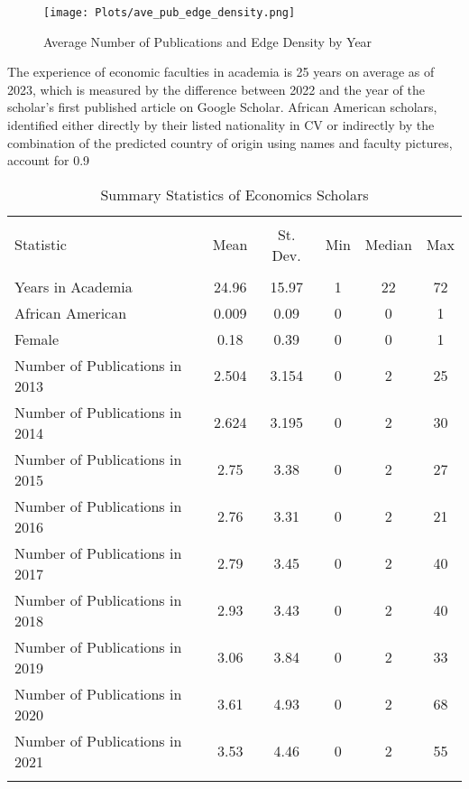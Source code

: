 \begin{figure}[!htbp]
  \caption{Average Number of Publications and Edge Density by Year}
  \centering
  \texttt{[image: Plots/ave\_pub\_edge\_density.png]}
\end{figure}

The experience of economic faculties in academia is 25 years on average as of 2023, which is measured by the difference between 2022 and the year of the scholar's first published article on Google Scholar. African American scholars, identified either directly by their listed nationality in CV or indirectly by the combination of the predicted country of origin using names and faculty pictures, account for 0.9\
\begin{table}[!htbp] \centering 
  \caption{Summary Statistics of Economics Scholars} 
\begin{tabular}{@{\extracolsep{5pt}}lccccc} 
\\[-1.8ex]\hline 
\hline \\[-1.8ex] 
Statistic & \multicolumn{1}{c}{Mean} & \multicolumn{1}{c}{St. Dev.} & \multicolumn{1}{c}{Min} & \multicolumn{1}{c}{Median} & \multicolumn{1}{c}{Max} \\ 
\hline \\[-1.8ex] 
Years in Academia & 24.96 & 15.97 & 1 & 22 & 72 \\ 
African American & 0.009 & 0.09 & 0 & 0 & 1 \\
Female & 0.18 & 0.39 & 0 & 0 & 1 \\
Number of Publications in 2013 & 2.504 & 3.154 & 0 & 2 & 25 \\ 
Number of Publications in 2014 & 2.624 & 3.195 & 0 & 2 & 30 \\ 
Number of Publications in 2015 & 2.75 & 3.38 & 0 & 2 & 27 \\ 
Number of Publications in 2016 & 2.76 & 3.31 & 0 & 2 & 21 \\ 
Number of Publications in 2017 & 2.79 & 3.45 & 0 & 2 & 40 \\ 
Number of Publications in 2018 & 2.93 & 3.43 & 0 & 2 & 40 \\ 
Number of Publications in 2019 & 3.06 & 3.84 & 0 & 2 & 33 \\ 
Number of Publications in 2020 & 3.61 & 4.93 & 0 & 2 & 68 \\ 
Number of Publications in 2021 & 3.53 & 4.46 & 0 & 2 & 55 \\ 
\hline \\[-1.8ex] 
\end{tabular} 
\end{table} 

